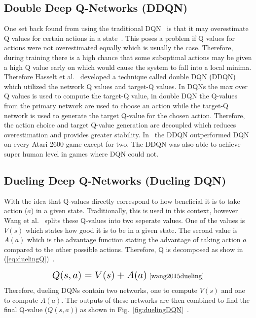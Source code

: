 \documentclass[12pt,american]{report}
\begin{document}
\subsection{Double Deep Q-Networks (DDQN)}

One set back found from using the traditional DQN~\cite{atari} is that it may overestimate Q values for certain actions in a state~\cite{van2016deep}. This poses a problem if Q values for actions were not overestimated equally which is usually the case.  Therefore, during training there is a high chance that some suboptimal actions may be given a high Q value early on which would cause the system to fall into a local minima.  Therefore Hasselt et al.~\cite{van2016deep} developed a technique called double DQN (DDQN) which utilized the network Q values and target-Q values.  In DQNs the max over Q values is used to compute the target-Q value, in double DQN the Q-values from the primary network are used to choose an action while the target-Q network is used to generate the target Q-value for the chosen action. Therefore, the action choice and target Q-value generation are decoupled which reduces overestimation and provides greater stability.  In~\cite{van2016deep}  the DDQN outperformed DQN on every Atari 2600 game except for two. The DDQN was also able to achieve super human level in games where DQN could not. 

\subsection{Dueling Deep Q-Networks (Dueling DQN)}
With the idea that Q-values directly correspond to how beneficial it is to take action ($a$) in a given state. Traditionally, this is used in this context, however Wang et al.~\cite{wang2015dueling} splits these Q-values into two seperate values.  One of the values is $V(s)$ which states how good it is to be in a given state. The second value is $A(a)$ which is the advantage function stating the advantage of taking action $a$ compared to the other possible actions.  Therefore, Q is decomposed as show in (\ref{eq:duelingQ})~\cite{wang2015dueling}.

\begin{equation}
          \label{eq:duelingQ}
          \resizebox{0.4\textwidth}{!}{$Q(s,a) = V(s) + A(a)$}~\cite{wang2015dueling}%
\end{equation}
Therefore, dueling DQNs contain two networks, one to compute $V(s)$ and one to compute $A(a)$.  The outputs of these networks are then combined to find the final Q-value ($Q(s,a)$) as shown in Fig.~\ref{fig:duelingDQN}~\cite{wang2015dueling}.
\end{document}
